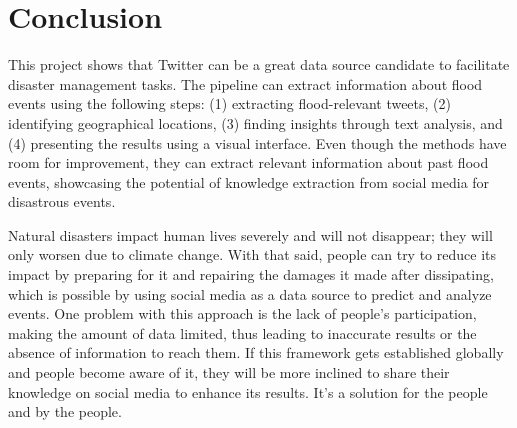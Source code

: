 \chapter{Conclusion}%
This project shows that Twitter can be a great data source candidate to facilitate disaster
management tasks. The pipeline can extract information about flood events using the following steps:
(1) extracting flood-relevant tweets, (2) identifying geographical locations, (3) finding insights
through text analysis, and (4) presenting the results using a visual interface. Even though the
methods have room for improvement, they can extract relevant information about past flood events,
showcasing the potential of knowledge extraction from social media for disastrous events.

Natural disasters impact human lives severely and will not disappear; they will only worsen due to
climate change. With that said, people can try to reduce its impact by preparing for it and
repairing the damages it made after dissipating, which is possible by using social media as a data
source to predict and analyze events. One problem with this approach is the lack of people's
participation, making the amount of data limited, thus leading to inaccurate results or the absence
of information to reach them. If this framework gets established globally and people become aware of
it, they will be more inclined to share their knowledge on social media to enhance its results. It's
a solution for the people and by the people.

